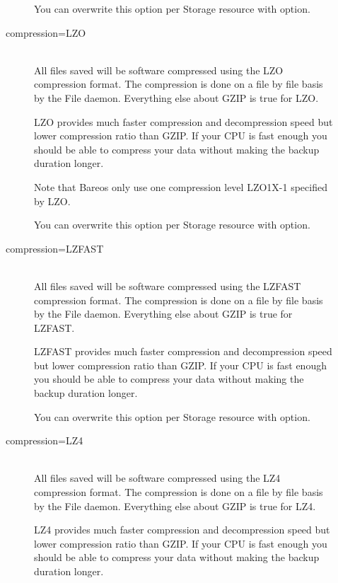 \begin{description}
\begin{description}
        You can overwrite this option per Storage resource with
         option.

        \item [compression=LZO] \hfill \\
        All files saved will be software compressed using the LZO
        compression format. The compression is done on a file by file basis by
        the File daemon. Everything else about GZIP is true for LZO.

        LZO provides much faster compression and decompression speed but lower
        compression ratio than GZIP. If your CPU is fast enough you should be able
        to compress your data without making the backup duration longer.

        Note that Bareos only use one compression level LZO1X-1 specified by LZO.

        You can overwrite this option per Storage resource with
         option.

        \item [compression=LZFAST] \hfill \\
        All files saved will be software compressed using the LZFAST
        compression format. The compression is done on a file by file basis by
        the File daemon. Everything else about GZIP is true for LZFAST.

        LZFAST provides much faster compression and decompression speed but lower
        compression ratio than GZIP. If your CPU is fast enough you should be able
        to compress your data without making the backup duration longer.

        You can overwrite this option per Storage resource with
         option.

        \item [compression=LZ4] \hfill \\
        All files saved will be software compressed using the LZ4
        compression format. The compression is done on a file by file basis by
        the File daemon. Everything else about GZIP is true for LZ4.

        LZ4 provides much faster compression and decompression speed but lower
        compression ratio than GZIP. If your CPU is fast enough you should be able
        to compress your data without making the backup duration longer.


\end{description}
\end{description}
